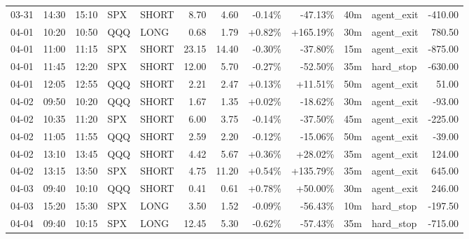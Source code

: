 \documentclass[11pt,a4paper,twoside]{article}
\begin{document}
\begin{center}
\begin{longtable}{>{\color{txtmain}}l l l l l r r r r r >{\color{txtmain}}l r}
03-31 & 14:30 & 15:10 & SPX & SHORT & 8.70 & 4.60 & \textcolor{lossred}{-0.14\%} & \textcolor{lossred}{-47.13\%} & 40m & agent\_exit & \textcolor{lossred}{-410.00} \\
04-01 & 10:20 & 10:50 & QQQ & LONG & 0.68 & 1.79 & \textcolor{wingreen}{+0.82\%} & \textcolor{wingreen}{+165.19\%} & 30m & agent\_exit & \textcolor{wingreen}{780.50} \\
04-01 & 11:00 & 11:15 & SPX & SHORT & 23.15 & 14.40 & \textcolor{lossred}{-0.30\%} & \textcolor{lossred}{-37.80\%} & 15m & agent\_exit & \textcolor{lossred}{-875.00} \\
04-01 & 11:45 & 12:20 & SPX & SHORT & 12.00 & 5.70 & \textcolor{lossred}{-0.27\%} & \textcolor{lossred}{-52.50\%} & 35m & hard\_stop & \textcolor{lossred}{-630.00} \\
04-01 & 12:05 & 12:55 & QQQ & SHORT & 2.21 & 2.47 & \textcolor{wingreen}{+0.13\%} & \textcolor{wingreen}{+11.51\%} & 50m & agent\_exit & \textcolor{wingreen}{51.00} \\
04-02 & 09:50 & 10:20 & QQQ & SHORT & 1.67 & 1.35 & \textcolor{wingreen}{+0.02\%} & \textcolor{lossred}{-18.62\%} & 30m & agent\_exit & \textcolor{lossred}{-93.00} \\
04-02 & 10:35 & 11:20 & SPX & SHORT & 6.00 & 3.75 & \textcolor{lossred}{-0.14\%} & \textcolor{lossred}{-37.50\%} & 45m & agent\_exit & \textcolor{lossred}{-225.00} \\
04-02 & 11:05 & 11:55 & QQQ & SHORT & 2.59 & 2.20 & \textcolor{lossred}{-0.12\%} & \textcolor{lossred}{-15.06\%} & 50m & agent\_exit & \textcolor{lossred}{-39.00} \\
04-02 & 13:10 & 13:45 & QQQ & SHORT & 4.42 & 5.67 & \textcolor{wingreen}{+0.36\%} & \textcolor{wingreen}{+28.02\%} & 35m & agent\_exit & \textcolor{wingreen}{124.00} \\
04-02 & 13:15 & 13:50 & SPX & SHORT & 4.75 & 11.20 & \textcolor{wingreen}{+0.54\%} & \textcolor{wingreen}{+135.79\%} & 35m & agent\_exit & \textcolor{wingreen}{645.00} \\
04-03 & 09:40 & 10:10 & QQQ & SHORT & 0.41 & 0.61 & \textcolor{wingreen}{+0.78\%} & \textcolor{wingreen}{+50.00\%} & 30m & agent\_exit & \textcolor{wingreen}{246.00} \\
04-03 & 15:20 & 15:30 & SPX & LONG & 3.50 & 1.52 & \textcolor{lossred}{-0.09\%} & \textcolor{lossred}{-56.43\%} & 10m & hard\_stop & \textcolor{lossred}{-197.50} \\
04-04 & 09:40 & 10:15 & SPX & LONG & 12.45 & 5.30 & \textcolor{lossred}{-0.62\%} & \textcolor{lossred}{-57.43\%} & 35m & hard\_stop & \textcolor{lossred}{-715.00} \\

\end{longtable}
\end{center}
\end{document}
